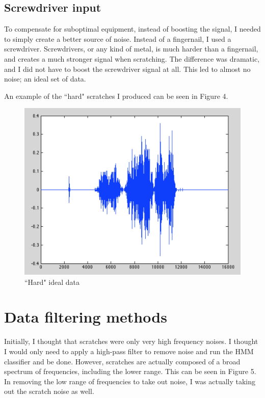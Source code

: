 \documentclass[12pt]{article}
\begin{document}
\FloatBarrier
\subsection{Screwdriver input}
To compensate for suboptimal equipment, instead of boosting the signal, I needed to simply create a better source of noise. Instead of a fingernail, I used a screwdriver. Screwdrivers, or any kind of metal, is much harder than a fingernail, and creates a much stronger signal when scratching. The difference was dramatic, and I did not have to boost the screwdriver signal at all. This led to almost no noise; an ideal set of data.

An example of the ``hard" scratches I produced can be seen in Figure 4.

\begin{figure}[h!]
\centering
\includegraphics[scale=0.7]{hard.png}
\caption{``Hard" ideal data}
\end{figure}

\FloatBarrier

\section{Data filtering methods}

Initially, I thought that scratches were only very high frequency noises. I thought I would only need to apply a high-pass filter to remove noise and run the HMM classifier and be done. However, scratches are actually composed of a broad spectrum of frequencies, including the lower range. This can be seen in Figure 5. In removing the low range of frequencies to take out noise, I was actually taking out the scratch noise as well.
\end{document}
